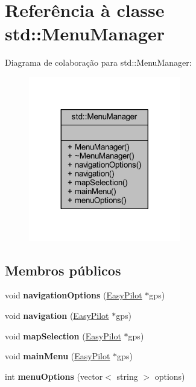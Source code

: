 \hypertarget{classstd_1_1_menu_manager}{}\section{Referência à classe std\+:\+:Menu\+Manager}
\label{classstd_1_1_menu_manager}


Diagrama de colaboração para std\+:\+:Menu\+Manager\+:
\nopagebreak
\begin{figure}[H]
\begin{center}
\leavevmode
\includegraphics[width=188pt]{classstd_1_1_menu_manager__coll__graph}
\end{center}
\end{figure}
\subsection*{Membros públicos}
\begin{DoxyCompactItemize}
\item 
\hypertarget{classstd_1_1_menu_manager_a6b49d6cd4fe3260d9642dbb20381f43c}{}void {\bfseries navigation\+Options} (\hyperlink{class_easy_pilot}{Easy\+Pilot} $\ast$gps)\label{classstd_1_1_menu_manager_a6b49d6cd4fe3260d9642dbb20381f43c}

\item 
\hypertarget{classstd_1_1_menu_manager_a07bff9624aa3fc9104ec98c79b8c37a1}{}void {\bfseries navigation} (\hyperlink{class_easy_pilot}{Easy\+Pilot} $\ast$gps)\label{classstd_1_1_menu_manager_a07bff9624aa3fc9104ec98c79b8c37a1}

\item 
\hypertarget{classstd_1_1_menu_manager_a77cd2018d2592e12d39dd07eb6f21022}{}void {\bfseries map\+Selection} (\hyperlink{class_easy_pilot}{Easy\+Pilot} $\ast$gps)\label{classstd_1_1_menu_manager_a77cd2018d2592e12d39dd07eb6f21022}

\item 
\hypertarget{classstd_1_1_menu_manager_a638c286f464bf2d495aa2b4fb213302e}{}void {\bfseries main\+Menu} (\hyperlink{class_easy_pilot}{Easy\+Pilot} $\ast$gps)\label{classstd_1_1_menu_manager_a638c286f464bf2d495aa2b4fb213302e}

\item 
\hypertarget{classstd_1_1_menu_manager_a1235a2b53d90aeb5f60c043be9caf62b}{}int {\bfseries menu\+Options} (vector$<$ string $>$ options)\label{classstd_1_1_menu_manager_a1235a2b53d90aeb5f60c043be9caf62b}

\end{DoxyCompactItemize}


